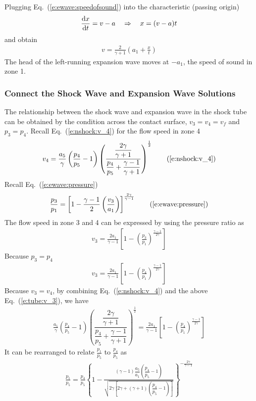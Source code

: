 \documentclass{turgon}
\begin{document}
Plugging Eq.~(\ref{e:ewave:speedofsound}) into the characteristic (passing
origin)
%
\begin{align*}
  \frac{\mathop{}\!\mathrm{d} x}{\mathop{}\!\mathrm{d} t} = v - a
  \quad \Rightarrow \quad x = (v - a) t
\end{align*}
%
and obtain
%
\begin{align}
  v = \frac{2}{\gamma + 1}\left(a_1 + \frac{x}{t}\right)
\end{align}
%
The head of the left-running expansion wave moves at $-a_1$, the speed of sound
in zone 1.

\subsubsection{Connect the Shock Wave and Expansion Wave Solutions}

The relationship between the shock wave and expansion wave in the shock tube
can be obtained by the condition across the contact surface, $v_3 = v_4 = v_f$
and $p_3 = p_4$.
Recall Eq.~(\ref{e:nshock:v_4}) for the flow speed in zone 4
%
\begin{align}
  v_4 = \frac{a_5}{\gamma} \left(\frac{p_4}{p_5} - 1\right)
  \left(
  \dfrac{\dfrac{2\gamma}{\gamma+1}}
  {\dfrac{p_4}{p_5} + \dfrac{\gamma-1}{\gamma+1}}
  \right)^{\frac{1}{2}}
  \tag{\ref{e:nshock:v_4}}
\end{align}
%
Recall Eq.~(\ref{e:ewave:pressure})
%
\begin{align}
  \frac{p_3}{p_1} =
  \left[1 - \frac{\gamma - 1}{2}\left(\frac{v_3}{a_1}\right)\right]^{
    \frac{2\gamma}{\gamma-1}}
  \tag{\ref{e:ewave:pressure}}
\end{align}
%
The flow speed in zone 3 and 4 can be expressed by using the pressure ratio as
%
\begin{align*}
  v_3 = \frac{2 a_1}{\gamma - 1}
  \left[
  1 - \left(\frac{p_3}{p_1}\right)^{\frac{\gamma-1}{2\gamma}}
  \right]
\end{align*}
%
Because $p_3 = p_4$
%
\begin{align}
  v_3 = \frac{2 a_1}{\gamma - 1}
  \left[
  1 - \left(\frac{p_4}{p_1}\right)^{\frac{\gamma-1}{2\gamma}}
  \right]
  \label{e:tube:v_3}
\end{align}
%
Because $v_3 = v_4$, by combining Eq.~(\ref{e:nshock:v_4}) and the above
Eq.~(\ref{e:tube:v_3}), we have
%
\begin{align*}
  \frac{a_5}{\gamma} \left(\frac{p_4}{p_5} - 1\right)
  \left(
  \dfrac{\dfrac{2\gamma}{\gamma+1}}
  {\dfrac{p_4}{p_5} + \dfrac{\gamma-1}{\gamma+1}}
  \right)^{\frac{1}{2}}
  = \frac{2 a_1}{\gamma - 1}
  \left[
  1 - \left(\frac{p_4}{p_1}\right)^{\frac{\gamma-1}{2\gamma}}
  \right]
\end{align*}
%
It can be rearranged to relate $\frac{p_1}{p_5}$ to $\frac{p_4}{p_5}$ as
%
\begin{align}
  \frac{p_1}{p_5} = \frac{p_4}{p_5}
  \left\{
  1 - \frac
  {(\gamma-1)\dfrac{a_5}{a_1}\left(\dfrac{p_4}{p_5} - 1\right)}
  {\sqrt{2\gamma
  \left[
    2\gamma + (\gamma+1)\left(\dfrac{p_4}{p_5}-1\right)
    \right]}}
  \right\}^{-\frac{2\gamma}{\gamma-1}}
\end{align}
\end{document}
